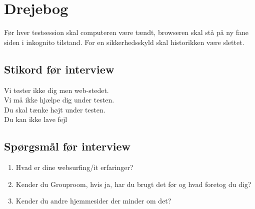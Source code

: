 \documentclass[12pt]{article}
\begin{document}
  \section{Drejebog}
  Før hver testsession skal computeren være tændt, browseren skal stå på ny fane siden i inkognito tilstand. For en sikkerhedsskyld skal historikken være slettet.
  \subsection{Stikord før interview}
  Vi tester ikke dig men web-stedet. \\
  Vi må ikke hjælpe dig under testen. \\
  Du skal tænke højt under testen. \\
  Du kan ikke lave fejl
  \subsection{Spørgsmål før interview}
  \begin{enumerate}
    \item Hvad er dine websurfing/it erfaringer?
    \item Kender du Grouproom, hvis ja, har du brugt det før og hvad foretog du dig?
    \item Kender du andre hjemmesider der minder om det?
  \end{enumerate}
\end{document}
